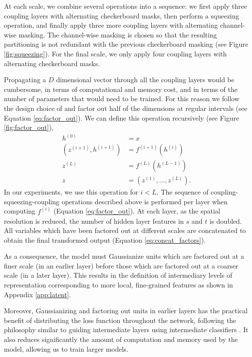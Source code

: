 \documentclass{article}
\begin{document}
At each scale, we combine several operations into a sequence: we first apply three coupling layers with alternating checkerboard masks, then perform a squeezing operation, and finally apply three more coupling layers with alternating channel-wise masking. The channel-wise masking is chosen so that the resulting partitioning is not redundant with the previous checkerboard masking (see Figure \ref{fig:squeezing}). For the final scale, we only apply four coupling layers with alternating checkerboard masks. 

Propagating a $D$ dimensional vector through all the coupling layers would be cumbersome, in terms of computational and memory cost, and in terms of the number of parameters that would need to be trained.
For this reason we follow the design choice of \citep{simonyan2014very} and factor out half of the dimensions at regular intervals (see Equation \ref{eq:factor_out}).
We can define this operation recursively (see Figure \ref{fig:factor_out}),
\begin{align}
h^{(0)} &= x \\
(z^{(i + 1)}, h^{(i + 1)}) &= f^{(i + 1)}(h^{(i)})
\label{eq:factor_out} \\
z^{(L)} &= f^{(L)}(h^{(L - 1)})
\label{eq:final_factor}\\
z &= (z^{(1)}, \dots, z^{(L)})
\label{eq:concat_factors}
.
\end{align}
In our experiments, we use this operation for $i < L$.
The sequence of coupling-squeezing-coupling operations described above is performed per layer when computing $f^{(i)}$ (Equation \ref{eq:factor_out}).
At each layer, as the spatial resolution is reduced, the number of hidden layer features in $s$ and $t$ is doubled.
All variables which have been factored out at different scales are concatenated to obtain the final transformed output (Equation \ref{eq:concat_factors}).


As a consequence, the model must Gaussianize units which are factored out at a finer scale (in an earlier layer) before those which are factored out at a coarser scale (in a later layer). This results in the definition of intermediary levels of representation \citep{salakhutdinov2009deep, rezende2014stochastic} corresponding to more local, fine-grained features as shown in Appendix \ref{app:latent}.

Moreover, Gaussianizing and factoring out units in earlier layers has the practical benefit of distributing the loss function throughout the network, following the philosophy similar to guiding intermediate layers using intermediate classifiers \citep{lee2014deeply}. It also reduces significantly the amount of computation and memory used by the model, allowing us to train larger models.
\end{document}
